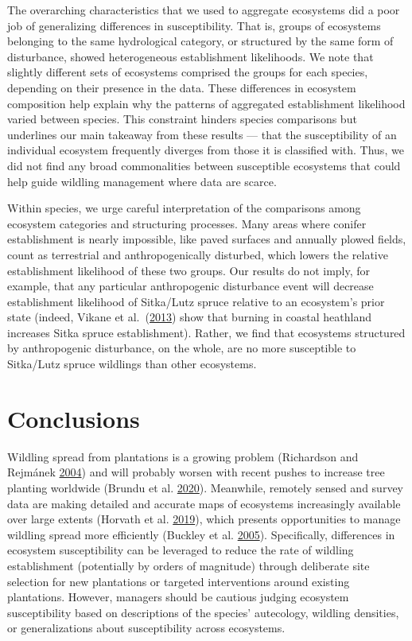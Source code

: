 \documentclass[
]{article}
\begin{document}
The overarching characteristics that we used to aggregate ecosystems did a poor job of generalizing differences in susceptibility.
That is, groups of ecosystems belonging to the same hydrological category, or structured by the same form of disturbance, showed heterogeneous establishment likelihoods.
We note that slightly different sets of ecosystems comprised the groups for each species, depending on their presence in the data.
These differences in ecosystem composition help explain why the patterns of aggregated establishment likelihood varied between species.
This constraint hinders species comparisons but underlines our main takeaway from these results --- that the susceptibility of an individual ecosystem frequently diverges from those it is classified with.
Thus, we did not find any broad commonalities between susceptible ecosystems that could help guide wildling management where data are scarce.

Within species, we urge careful interpretation of the comparisons among ecosystem categories and structuring processes.
Many areas where conifer establishment is nearly impossible, like paved surfaces and annually plowed fields, count as terrestrial and anthropogenically disturbed, which lowers the relative establishment likelihood of these two groups.
Our results do not imply, for example, that any particular anthropogenic disturbance event will decrease establishment likelihood of Sitka/Lutz spruce relative to an ecosystem's prior state (indeed, Vikane et al.~(\protect\hyperlink{ref-vikaneInvasionCallunaHeath2013}{2013}) show that burning in coastal heathland increases Sitka spruce establishment).
Rather, we find that ecosystems structured by anthropogenic disturbance, on the whole, are no more susceptible to Sitka/Lutz spruce wildlings than other ecosystems.

\hypertarget{conclusions}{%
\section{Conclusions}\label{conclusions}}

Wildling spread from plantations is a growing problem (Richardson and Rejmánek \protect\hyperlink{ref-richardsonConifersInvasiveAliens2004}{2004}) and will probably worsen with recent pushes to increase tree planting worldwide (Brundu et al. \protect\hyperlink{ref-brunduGlobalGuidelinesSustainable2020}{2020}).
Meanwhile, remotely sensed and survey data are making detailed and accurate maps of ecosystems increasingly available over large extents (Horvath et al. \protect\hyperlink{ref-horvathDistributionModellingVegetation2019}{2019}), which presents opportunities to manage wildling spread more efficiently (Buckley et al. \protect\hyperlink{ref-buckleySlowingPineInvasion2005}{2005}).
Specifically, differences in ecosystem susceptibility can be leveraged to
reduce the rate of wildling establishment (potentially by orders of magnitude) through deliberate site selection for new plantations or targeted interventions around existing plantations.
However, managers should be cautious judging ecosystem susceptibility based on descriptions of the species' autecology, wildling densities, or generalizations about susceptibility across ecosystems.
\end{document}
